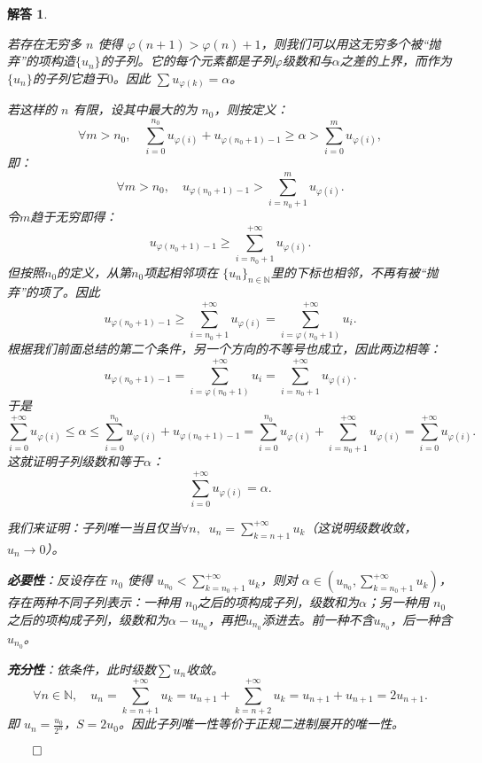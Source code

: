 \documentclass[12pt,UTF8]{ctexbook}
\theoremstyle{exercisestyle}
\theoremstyle{solutionstyle}
\newtheorem*{solution*}{解答}
\newenvironment{solution}
  {\begin{solution*}}
  {\hfill\ensuremath{\qed}\end{solution*}}
\begin{document}
\begin{solution}
\begin{subquestions}
若存在无穷多 $n$ 使得 $\varphi(n+1) > \varphi(n)+1$，则我们可以用这无穷多个被“抛弃”的项构造$\{u_n\}$的子列。它的每个元素都是子列$\varphi$级数和与$\alpha$之差的上界，而作为$\{u_n\}$的子列它趋于$0$。因此 $\sum u_{\varphi(k)} = \alpha$。

若这样的 $n$ 有限，设其中最大的为 $n_0$，则按定义：
$$ \forall m > n_0, \quad \sum_{i=0}^{n_0} u_{\varphi(i)} + u_{\varphi(n_0+1) - 1} \geqslant \alpha > \sum_{i=0}^{m} u_{\varphi(i)} ,$$
即：
$$
\forall m > n_0, \quad u_{\varphi(n_0+1) - 1} > \sum_{i=n_0+1}^{m} u_{\varphi(i)}.
$$
令$m$趋于无穷即得：
$$
u_{\varphi(n_0+1) - 1} \geqslant \sum_{i=n_0+1}^{+\infty} u_{\varphi(i)}.
$$
但按照$n_0$的定义，从第$n_0$项起相邻项在 $\{u_n\}_{n\in\mathbb{N}}$里的下标也相邻，不再有被“抛弃”的项了。因此
$$
u_{\varphi(n_0+1) - 1} \geqslant \sum_{i=n_0+1}^{+\infty} u_{\varphi(i)} = \sum_{i=\varphi(n_0+1)}^{+\infty} u_{i}.
$$
根据我们前面总结的第二个条件，另一个方向的不等号也成立，因此两边相等：
$$
u_{\varphi(n_0+1) - 1} = \sum_{i=\varphi(n_0+1)}^{+\infty} u_{i} = \sum_{i=n_0+1}^{+\infty} u_{\varphi(i)}.
$$
于是
$$
\sum_{i=0}^{+\infty} u_{\varphi(i)}\leqslant \alpha \leqslant \sum_{i=0}^{n_0} u_{\varphi(i)} + u_{\varphi(n_0+1) - 1} = \sum_{i=0}^{n_0} u_{\varphi(i)} + \sum_{i=n_0+1}^{+\infty} u_{\varphi(i)} = \sum_{i=0}^{+\infty} u_{\varphi(i)}.
$$
这就证明子列级数和等于$\alpha$：
$$
\sum_{i=0}^{+\infty} u_{\varphi(i)} = \alpha.
$$

\item 我们来证明：子列唯一当且仅当$\forall n, \;\;\displaystyle u_n = \sum_{k=n+1}^{+\infty} u_k$（这说明级数收敛， $u_n \to 0$）。

\textbf{必要性}：反设存在 $n_0$ 使得 $u_{n_0} < \sum_{k=n_0+1}^{+\infty} u_k$，则对 $\alpha \in \left( u_{n_0}, \sum_{k=n_0+1}^{+\infty} u_k \right)$，存在两种不同子列表示：一种用 $n_0$之后的项构成子列，级数和为$\alpha $；另一种用 $n_0$之后的项构成子列，级数和为$\alpha - u_{n_0}$，再把$u_{n_0}$添进去。前一种不含$u_{n_0}$，后一种含$u_{n_0}$。

\textbf{充分性}：依条件，此时级数$\sum u_n$收敛。 
$$
\forall n\in \mathbb{N},\quad u_n = \sum_{k=n+1}^{+\infty} u_k = u_{n+1} + \sum_{k=n+2}^{+\infty} u_k = u_{n+1} + u_{n+1} = 2u_{n+1}.
$$
即 $\displaystyle u_n = \frac{u_0}{2^n}$，$S = 2u_0$。因此子列唯一性等价于正规二进制展开的唯一性。
\end{subquestions}
\end{solution}
\end{document}
